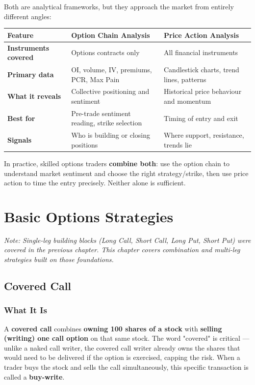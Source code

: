 \documentclass[12pt,openany]{book}
\begin{document}
Both are analytical frameworks, but they approach the market from entirely different angles:

\begin{center}
\scriptsize
\setlength{\tabcolsep}{3pt}
\begin{tabular}{|L{4.40cm}|L{4.40cm}|L{4.40cm}|}
\hline
Feature & Option Chain Analysis & Price Action Analysis \\
\hline
\textbf{Instruments covered} & Options contracts only & All financial instruments \\
\hline
\textbf{Primary data} & OI, volume, IV, premiums, PCR, Max Pain & Candlestick charts, trend lines, patterns \\
\hline
\textbf{What it reveals} & Collective positioning and sentiment & Historical price behaviour and momentum \\
\hline
\textbf{Best for} & Pre-trade sentiment reading, strike selection & Timing of entry and exit \\
\hline
\textbf{Signals} & Who is building or closing positions & Where support, resistance, trends lie \\
\hline
\end{tabular}
\end{center}

In practice, skilled options traders \textbf{combine both}: use the option chain to understand market sentiment and choose the right strategy/strike, then use price action to time the entry precisely. Neither alone is sufficient.

\section{Basic Options Strategies}

\emph{Note: Single-leg building blocks (Long Call, Short Call, Long Put, Short Put) were covered in the previous chapter. This chapter covers combination and multi-leg strategies built on those foundations.}



\subsection{Covered Call}

\subsubsection{What It Is}

A \textbf{covered call} combines \textbf{owning 100 shares of a stock} with \textbf{selling (writing) one call option} on that same stock. The word "covered" is critical — unlike a naked call writer, the covered call writer already owns the shares that would need to be delivered if the option is exercised, capping the risk. When a trader buys the stock and sells the call simultaneously, this specific transaction is called a \textbf{buy-write}.
\end{document}
